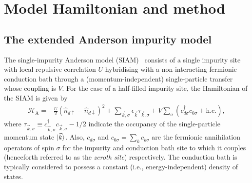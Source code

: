 \documentclass{iopart}
\begin{document}
\section{Model Hamiltonian and method}

\subsection{The extended Anderson impurity model}
\label{def-ham}

The single-impurity Anderson model (SIAM)~\cite{anderson_1961,anderson_1978} consists of a single impurity site with local repulsive correlation \(U\) hybridising with a non-interacting fermionic conduction bath through a (momentum-independent) single-particle transfer whose coupling is \(V\). For the case of a half-filled impurity site, the Hamiltonian of the SIAM is given by
\begin{eqnarray} 
	\mathcal{H}_\text{A} = -\frac{U}{2} \left(\hat n_{d \uparrow} - \hat n_{d \downarrow}\right)^2 + \sum_{\vec k,\sigma} \epsilon_{\vec k} \tau_{\vec k,\sigma} + V\sum_\sigma \left(c^\dagger_{d\sigma}c_{0\sigma} + \text{h.c.}\right),
	\label{basic-siam}
\end{eqnarray}
where \(\tau_{\vec k,\sigma} \equiv c^\dagger_{\vec k,\sigma}c_{\vec k,\sigma} - 1/2\) indicate the occupancy of the single-particle momentum state \(\ket{\vec k}\). Also, \(c_{d\sigma}\) and \(c_{0\sigma} = \sum_k c_{k\sigma}\) are the fermionic annihilation operators of spin \(\sigma\) for the impurity and conduction bath site to which it couples (henceforth referred to as the {\it zeroth site}) respectively.  The conduction bath is typically considered to possess a constant (i.e., energy-independent) density of states. 
\end{document}
